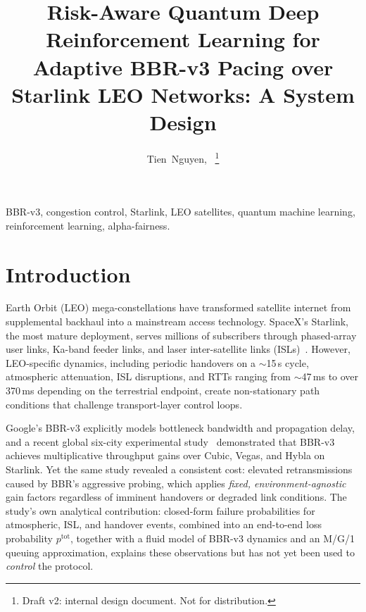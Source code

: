 \documentclass[journal]{IEEEtran}
\begin{document}
\title{Risk-Aware Quantum Deep Reinforcement Learning for Adaptive BBR-v3
Pacing over Starlink LEO Networks: A System Design}

\author{Tien~Nguyen,~\IEEEmembership{}%
\thanks{Draft v2: internal design document. Not for distribution.}}

\maketitle

\begin{abstract}
\end{abstract}

\begin{IEEEkeywords}
BBR-v3, congestion control, Starlink, LEO satellites, quantum machine
learning, reinforcement learning, alpha-fairness.
\end{IEEEkeywords}

\section{Introduction}
 Earth Orbit (LEO) mega-constellations have transformed
satellite internet from supplemental backhaul into a mainstream access
technology. SpaceX's Starlink, the most mature deployment, serves millions of
subscribers through phased-array user links, Ka-band feeder links, and laser
inter-satellite links (ISLs)~\cite{desilva2026tmc}. However, LEO-specific
dynamics, including periodic handovers on a $\sim$15\,s cycle, atmospheric
attenuation, ISL disruptions, and RTTs ranging from $\sim$47\,ms to over
370\,ms depending on the terrestrial endpoint, create non-stationary path
conditions that challenge transport-layer control loops.

Google's BBR-v3 explicitly models bottleneck bandwidth and propagation delay,
and a recent global six-city experimental study~\cite{desilva2026tmc,
desilva2026icoin} demonstrated that BBR-v3 achieves multiplicative throughput
gains over Cubic, Vegas, and Hybla on Starlink. Yet the same study revealed a
consistent cost: elevated retransmissions caused by BBR's aggressive probing,
which applies \emph{fixed, environment-agnostic} gain factors regardless of
imminent handovers or degraded link conditions. The study's own analytical
contribution: closed-form failure probabilities for atmospheric, ISL, and
handover events, combined into an end-to-end loss probability
$p^{\mathrm{tot}}$, together with a fluid model of BBR-v3 dynamics and an
M/G/1 queuing approximation, explains these observations but has not yet
been used to \emph{control} the protocol.
\end{document}
